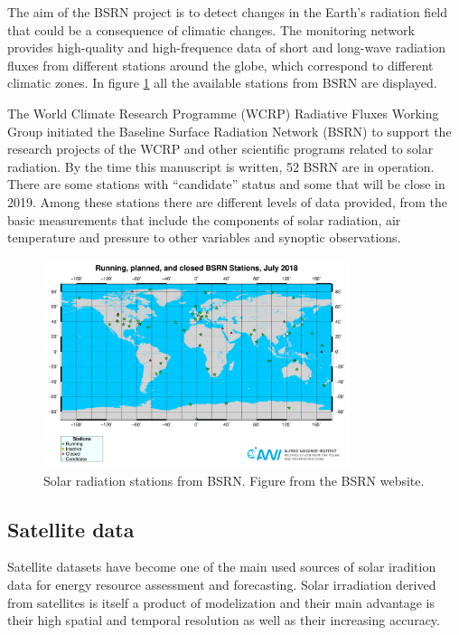 The aim of the BSRN project is to detect changes in the Earth's radiation field that could be a consequence of climatic changes. The monitoring network provides high-quality and high-frequence data of short and long-wave radiation fluxes from different stations around the globe, which correspond to different climatic zones. In figure \ref{fig:bsrnstations} all the available stations from BSRN are displayed.

The World Climate Research Programme (WCRP) Radiative Fluxes Working Group initiated the Baseline Surface Radiation Network (BSRN) to support the research projects of the WCRP and other scientific programs related to solar radiation. By the time this manuscript is written, 52 BSRN are in operation. There are some stations with ``candidate'' status and some that will be close in 2019. Among these stations there are different levels of data provided, from the basic measurements that include the components of solar radiation, air temperature and pressure to other variables and synoptic observations.

\begin{figure}[h]
  \centering
  \includegraphics[width=0.8\textwidth]{DataMethodsFIGS/bsrn.pdf}
  \caption{Solar radiation stations from BSRN. Figure from the BSRN website.}
 \label{fig:bsrnstations}
\end{figure}

\subsection{Satellite data}
 
Satellite datasets have become one of the main used sources of solar iradition data for energy resource assessment and forecasting. Solar irradiation derived from satellites is itself a product of modelization and their main advantage is their high spatial and temporal resolution as well as their increasing accuracy. 

